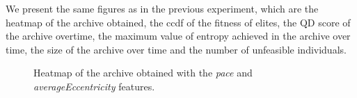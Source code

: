 We present the same figures as in the previous experiment, which are the heatmap of the archive obtained, the ccdf of the fitness of elites, the QD score of the archive overtime, the maximum value of entropy achieved in the archive over time, the size of the archive over time and the number of unfeasible individuals. 

\begin{figure}[H]
    \centering
    \qquad
    \caption{Heatmap of the archive obtained with the \textit{pace} and \textit{averageEccentricity} features.}
    \label{fig:heatmap_exp2}
\end{figure}

